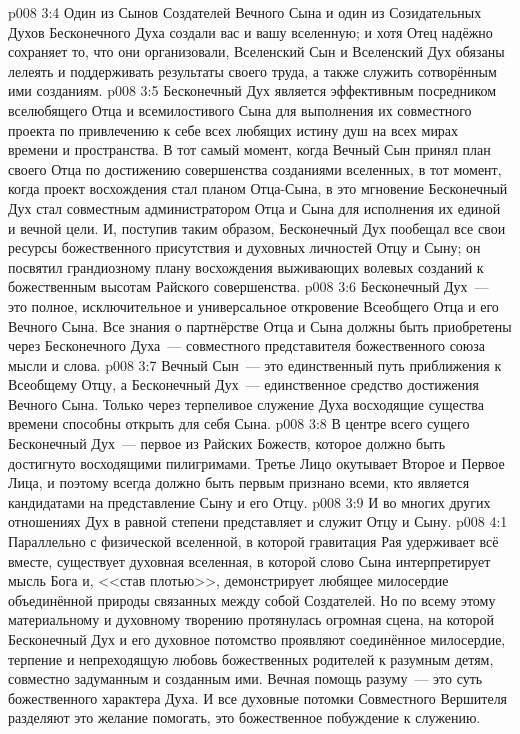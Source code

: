 \vs p008 3:4 Один из Сынов Создателей Вечного Сына и один из Созидательных Духов Бесконечного Духа создали вас и вашу вселенную; и хотя Отец надёжно сохраняет то, что они организовали, Вселенский Сын и Вселенский Дух обязаны лелеять и поддерживать результаты своего труда, а также служить сотворённым ими созданиям.
\vs p008 3:5 \pc Бесконечный Дух является эффективным посредником вселюбящего Отца и всемилостивого Сына для выполнения их совместного проекта по привлечению к себе всех любящих истину душ на всех мирах времени и пространства. В тот самый момент, когда Вечный Сын принял план своего Отца по достижению совершенства созданиями вселенных, в тот момент, когда проект восхождения стал планом Отца\hyp{}Сына, в это мгновение Бесконечный Дух стал совместным администратором Отца и Сына для исполнения их единой и вечной цели. И, поступив таким образом, Бесконечный Дух пообещал все свои ресурсы божественного присутствия и духовных личностей Отцу и Сыну; он посвятил  грандиозному плану восхождения выживающих волевых созданий к божественным высотам Райского совершенства.
\vs p008 3:6 Бесконечный Дух~--- это полное, исключительное и универсальное откровение Всеобщего Отца и его Вечного Сына. Все знания о партнёрстве Отца и Сына должны быть приобретены через Бесконечного Духа~--- совместного представителя божественного союза мысли и слова.
\vs p008 3:7 Вечный Сын~--- это единственный путь приближения к Всеобщему Отцу, а Бесконечный Дух~--- единственное средство достижения Вечного Сына. Только через терпеливое служение Духа восходящие существа времени способны открыть для себя Сына.
\vs p008 3:8 В центре всего сущего Бесконечный Дух~--- первое из Райских Божеств, которое должно быть достигнуто восходящими пилигримами. Третье Лицо окутывает Второе и Первое Лица, и поэтому всегда должно быть первым признано всеми, кто является кандидатами на представление Сыну и его Отцу.
\vs p008 3:9 И во многих других отношениях Дух в равной степени представляет и служит Отцу и Сыну.
\vs p008 4:1 Параллельно с физической вселенной, в которой гравитация Рая удерживает всё вместе, существует духовная вселенная, в которой слово Сына интерпретирует мысль Бога и, <<став плотью>>, демонстрирует любящее милосердие объединённой природы связанных между собой Создателей. Но по всему этому материальному и духовному творению протянулась огромная сцена, на которой Бесконечный Дух и его духовное потомство проявляют соединённое милосердие, терпение и непреходящую любовь божественных родителей к разумным детям, совместно задуманным и созданным ими. Вечная помощь разуму~--- это суть божественного характера Духа. И все духовные потомки Совместного Вершителя разделяют это желание помогать, это божественное побуждение к служению.
